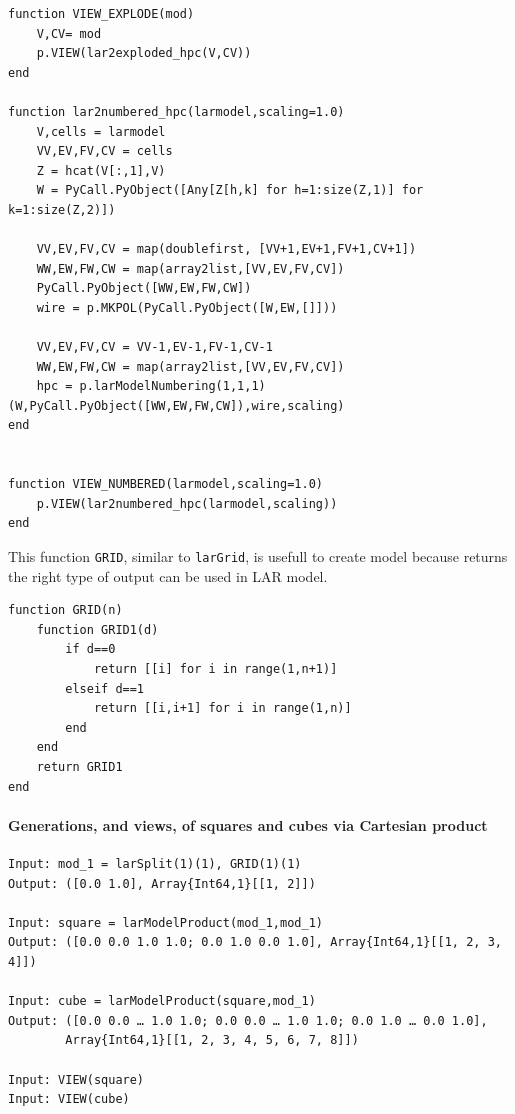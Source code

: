 \documentclass{article}
\begin{document}
\begin{flushleft}
\begin{list}{}{}
\begin{Verbatim}[tabsize=4]
function VIEW_EXPLODE(mod)
	V,CV= mod
	p.VIEW(lar2exploded_hpc(V,CV))
end

function lar2numbered_hpc(larmodel,scaling=1.0)
	V,cells = larmodel
	VV,EV,FV,CV = cells
	Z = hcat(V[:,1],V)
	W = PyCall.PyObject([Any[Z[h,k] for h=1:size(Z,1)] for k=1:size(Z,2)])

	VV,EV,FV,CV = map(doublefirst, [VV+1,EV+1,FV+1,CV+1])
	WW,EW,FW,CW = map(array2list,[VV,EV,FV,CV])
	PyCall.PyObject([WW,EW,FW,CW])
	wire = p.MKPOL(PyCall.PyObject([W,EW,[]]))

	VV,EV,FV,CV = VV-1,EV-1,FV-1,CV-1
	WW,EW,FW,CW = map(array2list,[VV,EV,FV,CV])
	hpc = p.larModelNumbering(1,1,1)(W,PyCall.PyObject([WW,EW,FW,CW]),wire,scaling)
end


function VIEW_NUMBERED(larmodel,scaling=1.0) 
	p.VIEW(lar2numbered_hpc(larmodel,scaling))
end

\end{Verbatim}
\end{list}
\end{flushleft}
\vspace{2ex}
This function \texttt{GRID}, similar to \texttt{larGrid}, is usefull to create model because returns the right type of output can be used in LAR model.

\begin{flushleft} \small
\begin{list}{}{} \item
   \begin{Verbatim}[tabsize=4]
function GRID(n)
    function GRID1(d)
        if d==0 
            return [[i] for i in range(1,n+1)]
        elseif d==1 
            return [[i,i+1] for i in range(1,n)] 
        end
    end
    return GRID1
end
   \end{Verbatim}
\end{list}
\end{flushleft}
\paragraph{Generations, and views, of squares and cubes via Cartesian product}

\begin{flushleft} \small
\begin{list}{}{} \item
 \begin{Verbatim}[tabsize=4]
Input: mod_1 = larSplit(1)(1), GRID(1)(1)
Output: ([0.0 1.0], Array{Int64,1}[[1, 2]])

Input: square = larModelProduct(mod_1,mod_1)
Output: ([0.0 0.0 1.0 1.0; 0.0 1.0 0.0 1.0], Array{Int64,1}[[1, 2, 3, 4]])

Input: cube = larModelProduct(square,mod_1)
Output: ([0.0 0.0 … 1.0 1.0; 0.0 0.0 … 1.0 1.0; 0.0 1.0 … 0.0 1.0],
        Array{Int64,1}[[1, 2, 3, 4, 5, 6, 7, 8]])

Input: VIEW(square) 
Input: VIEW(cube) 
   \end{Verbatim}
\end{list}
\end{flushleft}
\end{document}
